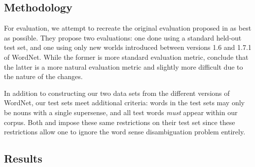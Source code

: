 \documentclass{article}
\begin{document}
\subsection{Methodology}


For evaluation, we attempt to recreate the original evaluation proposed in \cite{cj} as best as possible. They propose two evaluations: one done using a standard held-out test set, and one using only new worlds introduced between versions 1.6 and 1.7.1 of WordNet. While the former is more standard evaluation metric, \cite{cj} conclude that the latter is a more natural evaluation metric and slightly more difficult due to the nature of the changes.

In addition to constructing our two data sets from the different versions of WordNet, our test sets meet additional criteria: words in the test sets may only be nouns with a single supersense, and all test words \emph{must} appear within our corpus. Both \cite{cj} and \cite{curran} impose these same restrictions on their test set since these restrictions allow one to ignore the word sense disambiguation problem entirely.

\subsection{Results}

\end{document}
